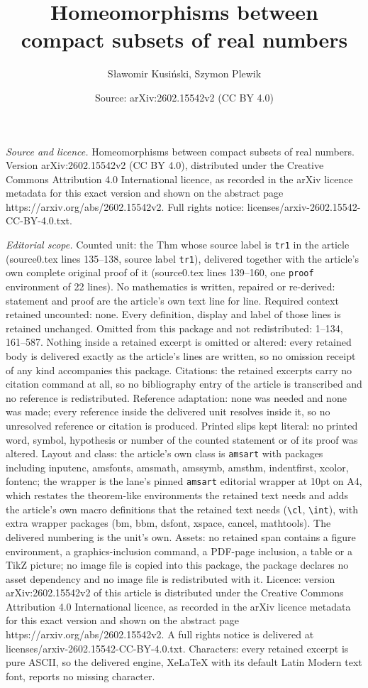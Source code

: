 \documentclass[10pt,a4paper]{amsart}
\title[Homeomorphisms between compact subsets of real numbers]{Homeomorphisms between compact subsets of real numbers}
\author{S{\l}awomir Kusi\'nski, Szymon Plewik}
\date{Source: arXiv:2602.15542v2 (CC BY 4.0)}
\begin{document}
\maketitle

\noindent\emph{Source and licence.} Homeomorphisms between compact subsets of real numbers. Version arXiv:2602.15542v2 (CC BY 4.0), distributed under the Creative Commons Attribution 4.0 International licence, as recorded in the arXiv licence metadata for this exact version and shown on the abstract page https://arxiv.org/abs/2602.15542v2. Full rights notice: licenses/arxiv-2602.15542-CC-BY-4.0.txt.\par\smallskip

\noindent\textit{Editorial scope.} Counted unit: the Thm whose source label is \texttt{tr1} in the article (source0.tex lines 135--138, source label \texttt{tr1}), delivered together with the article's own complete original proof of it (source0.tex lines 139--160, one \texttt{proof} environment of 22 lines). No mathematics is written, repaired or re-derived: statement and proof are the article's own text line for line. Required context retained uncounted: none. Every definition, display and label of those lines is retained unchanged. Omitted from this package and not redistributed: 1--134, 161--587. Nothing inside a retained excerpt is omitted or altered: every retained body is delivered exactly as the article's lines are written, so no omission receipt of any kind accompanies this package. Citations: the retained excerpts carry no citation command at all, so no bibliography entry of the article is transcribed and no reference is redistributed. Reference adaptation: none was needed and none was made; every reference inside the delivered unit resolves inside it, so no unresolved reference or citation is produced. Printed slips kept literal: no printed word, symbol, hypothesis or number of the counted statement or of its proof was altered. Layout and class: the article's own class is \texttt{amsart} with packages including inputenc, amsfonts, amsmath, amssymb, amsthm, indentfirst, xcolor, fontenc; the wrapper is the lane's pinned \texttt{amsart} editorial wrapper at 10pt on A4, which restates the theorem-like environments the retained text needs and adds the article's own macro definitions that the retained text needs (\texttt{\textbackslash cl}, \texttt{\textbackslash int}), with extra wrapper packages (bm, bbm, dsfont, xspace, cancel, mathtools). The delivered numbering is the unit's own. Assets: no retained span contains a figure environment, a graphics-inclusion command, a PDF-page inclusion, a table or a TikZ picture; no image file is copied into this package, the package declares no asset dependency and no image file is redistributed with it. Licence: version arXiv:2602.15542v2 of this article is distributed under the Creative Commons Attribution 4.0 International licence, as recorded in the arXiv licence metadata for this exact version and shown on the abstract page https://arxiv.org/abs/2602.15542v2. A full rights notice is delivered at licenses/arxiv-2602.15542-CC-BY-4.0.txt. Characters: every retained excerpt is pure ASCII, so the delivered engine, XeLaTeX with its default Latin Modern text font, reports no missing character.
\end{document}
